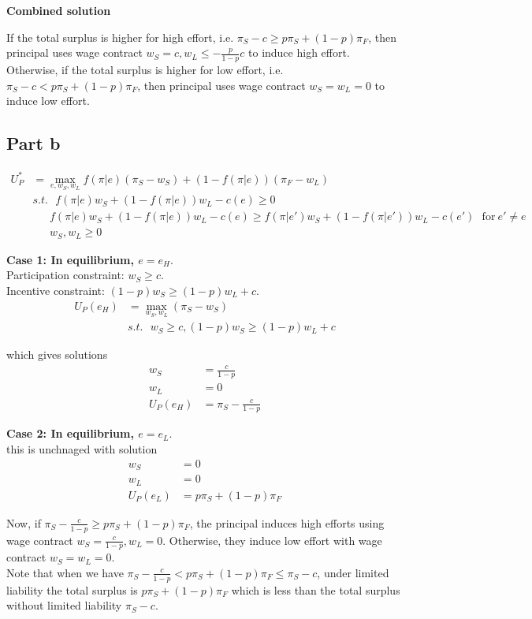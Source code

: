 \textbf{Combined solution}

If the total surplus is higher for high effort, i.e.  $\pi_S - c \ge p \pi_S + (1-p)\pi_F$, then principal uses wage contract $w_S = c,  w_L \le -\frac{p}{1-p} c$ to induce high effort. \\

Otherwise, if the total surplus is higher for low effort, i.e.  $\pi_S - c < p \pi_S + (1-p)\pi_F$, then principal uses wage contract $w_S = w_L = 0$ to induce low effort.

\subsection*{Part b}
\begin{align*}
    U_P^* &= \max_{e, w_S, w_L} f(\pi| e)(\pi_S- w_S) + (1-f(\pi| e))(\pi_F- w_L)\\
    & s.t. ~~~  f(\pi| e)w_S + (1-f(\pi| e))w_L - c(e) \ge 0\\
    &~~~~~~~   f(\pi| e)w_S + (1-f(\pi| e))w_L  - c(e)\ge f(\pi| e')w_S + (1-f(\pi| e'))w_L - c(e') ~~~\text{for}~e' \neq e\\
    &~~~~~~~ w_S, w_L \ge 0
\end{align*}

\textbf{Case 1: In equilibrium, $e= e_H$}.\\
Participation constraint: $w_S \ge c$.\\
Incentive constraint: $(1-p)w_S \ge (1-p)w_L + c$.\\

\begin{align*}
    U_P(e_H) &= \max_{w_S, w_L} (\pi_S- w_S) \\
    & s.t. ~~~  w_S \ge c, (1-p)w_S \ge (1-p)w_L + c
\end{align*}

which gives solutions
\begin{align*}
    w_S &= \frac{c}{1-p}\\
    w_L &= 0\\
    U_P(e_H) &= \pi_S - \frac{c}{1-p}
\end{align*}

\textbf{Case 2: In equilibrium, $e= e_L$}.\\
this is unchnaged with solution
\begin{align*}
    w_S &= 0\\
    w_L &= 0\\
    U_P(e_L) &= p \pi_S + (1-p)\pi_F
\end{align*}

Now, if $\pi_S - \frac{c}{1-p} \ge p \pi_S + (1-p)\pi_F$, the principal induces high efforts using wage contract $w_S = \frac{c}{1-p}, w_L = 0$. Otherwise, they induce low effort with wage contract $w_S = w_L = 0$. \\

Note that when we have $\pi_S - \frac{c}{1-p} < p \pi_S + (1-p)\pi_F \le \pi_S - c$, under limited liability the total surplus is $p \pi_S + (1-p)\pi_F$ which is less than the total surplus without limited liability $\pi_S - c$.